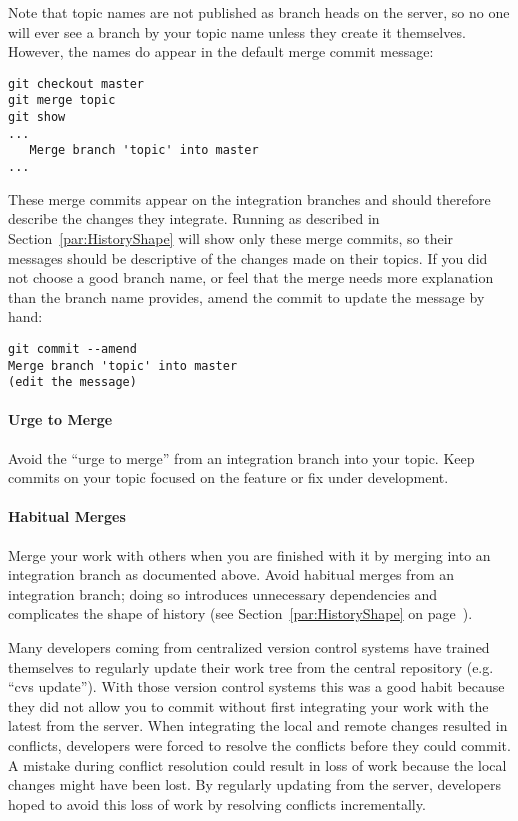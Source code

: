 Note that topic names are not published as branch heads on the server, so no one
will ever see a branch by your topic name unless they create it themselves.
However, the names do appear in the default merge commit message:

\begin{verbatim}
git checkout master
git merge topic
git show
...
   Merge branch 'topic' into master
...
\end{verbatim}

These merge commits appear on the integration branches and should therefore
describe the changes they integrate. Running  as
described in Section~\ref{par:HistoryShape} will show only these merge commits,
so their messages should be descriptive of the changes made on their topics. If
you did not choose a good branch name, or feel that the merge needs more
explanation than the branch name provides, amend the commit to update the
message by hand:

\begin{verbatim}
git commit --amend
Merge branch 'topic' into master
(edit the message)
\end{verbatim}


\paragraph{Urge to Merge}
\label{par:UrgeToMerge}

Avoid the ``urge to merge'' from an integration branch into your topic. Keep
commits on your topic focused on the feature or fix under development.

\paragraph{Habitual Merges}
\label{par:HabitualMerges}

Merge your work with others when you are finished with it by merging into an
integration branch as documented above. Avoid habitual merges from an
integration branch; doing so introduces unnecessary dependencies and complicates
the shape of history (see Section~\ref{par:HistoryShape} on
page~\pageref{par:HistoryShape}).

Many developers coming from centralized version control systems have trained
themselves to regularly update their work tree from the central repository (e.g.
``cvs update''). With those version control systems this was a good habit
because they did not allow you to commit without first integrating your work
with the latest from the server. When integrating the local and remote changes
resulted in conflicts, developers were forced to resolve the conflicts before
they could commit. A mistake during conflict resolution could result in loss of
work because the local changes might have been lost. By regularly updating from
the server, developers hoped to avoid this loss of work by resolving conflicts
incrementally.

